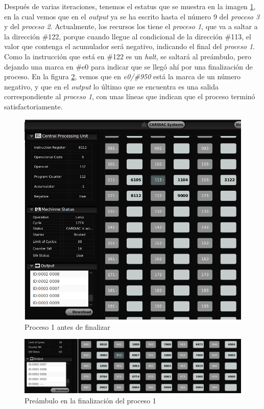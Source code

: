 \documentclass[letterpaper,12pt,oneside]{book}
\begin{document}
		Después de varias iteraciones, tenemos el estatus que se muestra en la imagen \ref{fig:proceso1BeforeFinish}, en la cual vemos que en el
		\textit{output} ya se ha escrito hasta el número 9 del \textit{proceso 3} y del \textit{proceso 2}. Actualmente, los 
		recursos los tiene el \textit{proceso 1}, que va a saltar a la dirección \#122, porque cuando llegue al condicional de la dirección
		\#113, el valor que contenga el acumulador será negativo, indicando el final del \textit{proceso 1}. Como la instrucción 
		que está en \#122 es un \textit{halt}, se saltará
		al preámbulo, pero dejando una marca en \#e0 para indicar que se llegó ahí por una finalización de proceso. En la figura 
		\ref{fig:proceso1FinishPream},
		vemos que en \textit{e0/\#950} está la marca de un número negativo, y que en el \textit{output} lo último que se encuentra es una salida 
		correspondiente al
		\textit{proceso 1}, con unas líneas que indican que el proceso terminó satisfactoriamente.
		
		\begin{figure}[h]		
			\centering
			\includegraphics[scale=0.4]{media/CARDIACC/proceso1BeforeFinish_cutted.png}
			\caption{ Proceso 1 antes de finalizar }
			\label{fig:proceso1BeforeFinish}
		\end{figure}
		
		
		\begin{figure}[h]		
			\centering
			\includegraphics[scale=0.4]{media/CARDIACC/proceso1FinishPream_cutted.png}
			\caption{ Preámbulo en la finalización del proceso 1}
			\label{fig:proceso1FinishPream}
		\end{figure}
		
\end{document}

